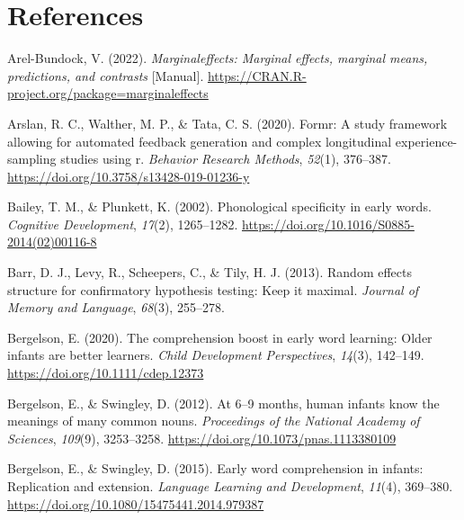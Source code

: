 \documentclass[
  man,
  floatsintext,
  colorlinks=true,linkcolor=blue,citecolor=blue,urlcolor=blue,biblatex]{apa7}
\newlength{\cslhangindent}
\newlength{\cslentryspacingunit} %
\newenvironment{CSLReferences}[2] %
 {%
  \setlength{\parindent}{0pt}
  \ifodd #1
  \let\oldpar\par
  \def\par{\hangindent=\cslhangindent\oldpar}
  \fi
  \setlength{\parskip}{#2\cslentryspacingunit}
 }%
 {}
\begin{document}
\hypertarget{sec-references}{%
\section{References}\label{sec-references}}

\hypertarget{refs}{}
\begin{CSLReferences}{1}{0}
\leavevmode{}%
Arel-Bundock, V. (2022). \emph{Marginaleffects: Marginal effects,
marginal means, predictions, and contrasts} {[}Manual{]}.
\url{https://CRAN.R-project.org/package=marginaleffects}

\leavevmode{}%
Arslan, R. C., Walther, M. P., \& Tata, C. S. (2020). Formr: A study
framework allowing for automated feedback generation and complex
longitudinal experience-sampling studies using r. \emph{Behavior
Research Methods}, \emph{52}(1), 376--387.
\url{https://doi.org/10.3758/s13428-019-01236-y}

\leavevmode{}%
Bailey, T. M., \& Plunkett, K. (2002). Phonological specificity in early
words. \emph{Cognitive Development}, \emph{17}(2), 1265--1282.
\url{https://doi.org/10.1016/S0885-2014(02)00116-8}

\leavevmode{}%
Barr, D. J., Levy, R., Scheepers, C., \& Tily, H. J. (2013). Random
effects structure for confirmatory hypothesis testing: Keep it maximal.
\emph{Journal of Memory and Language}, \emph{68}(3), 255--278.

\leavevmode{}%
Bergelson, E. (2020). The comprehension boost in early word learning:
Older infants are better learners. \emph{Child Development
Perspectives}, \emph{14}(3), 142--149.
\url{https://doi.org/10.1111/cdep.12373}

\leavevmode{}%
Bergelson, E., \& Swingley, D. (2012). At 6--9 months, human infants
know the meanings of many common nouns. \emph{Proceedings of the
National Academy of Sciences}, \emph{109}(9), 3253--3258.
\url{https://doi.org/10.1073/pnas.1113380109}

\leavevmode{}%
Bergelson, E., \& Swingley, D. (2015). Early word comprehension in
infants: Replication and extension. \emph{Language Learning and
Development}, \emph{11}(4), 369--380.
\url{https://doi.org/10.1080/15475441.2014.979387}


\end{CSLReferences}
\end{document}
